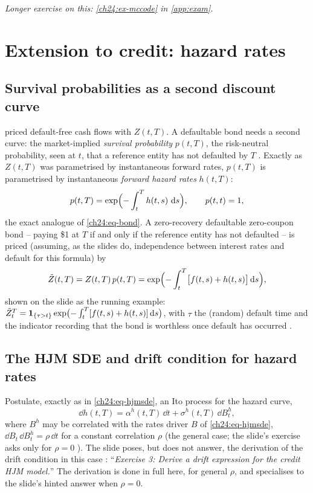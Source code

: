 \begin{paracol}{2}
\noindent\emph{Longer exercise on this: \cref{ch24:ex-mccode} in \cref{app:exam}.}

\section{Extension to credit: hazard rates}\label{ch24:sec-credit}

\subsection{Survival probabilities as a second discount curve}
 priced default-free cash flows with $Z(t,T)$. A defaultable bond needs a second curve: the market-implied \emph{survival probability} $p(t,T)$, the risk-neutral probability, seen at $t$, that a reference entity has not defaulted by $T$ . Exactly as $Z(t,T)$ was parametrised by instantaneous forward rates, $p(t,T)$ is parametrised by instantaneous \emph{forward hazard rates} $h(t,T)$:
\begin{equation}\label{ch24:eq-survival}
  p(t,T)=\exp\Bigl(-\int_t^Th(t,s)\,\,\mathrm{d} s\Bigr),\qquad p(t,t)=1,
\end{equation}
the exact analogue of \eqref{ch24:eq-bond}. A zero-recovery defaultable zero-coupon bond -- paying \$1 at $T$ if and only if the reference entity has not defaulted -- is priced (assuming, as the slides do, independence between interest rates and default for this formula) by
\begin{equation}\label{ch24:eq-defbond}
  \tilde Z(t,T)=Z(t,T)\,p(t,T)=\exp\Bigl(-\int_t^T\bigl[f(t,s)+h(t,s)\bigr]\,\mathrm{d} s\Bigr) ,
\end{equation}
 shown on the slide as the running example: $\tilde Z_t^T=\mathbf{1}_{\{\tau>t\}}\exp\bigl(-\int_t^T[f(t,s)+h(t,s)]\,\mathrm{d} s\bigr)$, with $\tau$ the (random) default time and the indicator recording that the bond is worthless once default has occurred .

\subsection{The HJM SDE and drift condition for hazard rates}
Postulate, exactly as in \eqref{ch24:eq-hjmsde}, an Ito process for the hazard curve,
\begin{equation}\label{ch24:eq-hjmcredit}
  \dd h(t,T)=\alpha^h(t,T)\,\dd t+\sigma^h(t,T)\,\dd B^h_t ,
\end{equation}
 where $B^h$ may be correlated with the rates driver $B$ of \eqref{ch24:eq-hjmsde}, $\dd B_t\,\dd B^h_t=\rho\,\dd t$ for a constant correlation $\rho$ (the general case; the slide's exercise asks only for $\rho=0$ ). The slide poses, but does not answer, the derivation of the drift condition in this case : ``\emph{Exercise 3: Derive a drift expression for the credit HJM model.}'' The derivation is done in full here, for general $\rho$, and specialises to the slide's hinted answer when $\rho=0$.


\end{paracol}
